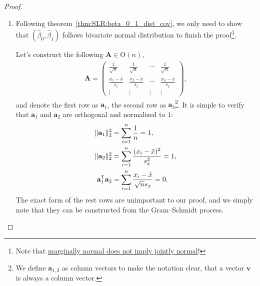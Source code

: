 \documentclass{book}
\begin{document}
\begin{proof}
\begin{enumerate}
\item Following theorem~\ref{thm:SLR:beta_0_1_dist_cov}, we only need to show that $(\hat{\beta}_0, \hat{\beta}_1)$ follows bivariate normal distribution to finish the proof\footnote{Note that \href{https://statproofbook.github.io/P/norm-margjoint.html}{marginally normal does not imply jointly normal}!}. 

Let's construct the following $\mathbf{A} \in \mathrm{O}(n)$,
\begin{align}
    \label{eqn:SLR:A-mat}
    \mathbf{A} = 
    \begin{pmatrix}
        \frac{1}{\sqrt{n}} & \frac{1}{\sqrt{n}} & \cdots & \frac{1}{\sqrt{n}}\\
        \frac{x_1-\bar{x}}{s_x} & \frac{x_2-\bar{x}}{s_x} & \cdots & \frac{x_n-\bar{x}}{s_x}\\
        \vdots & \vdots & \vdots & \vdots
    \end{pmatrix},
\end{align}
and denote the first row as $\mathbf{a}_{1}$, the second row as $\mathbf{a}_{2}$\footnote{We define $\mathbf{a}_{1,2}$ as column vectors to make the notation clear, that a vector $\mathbf{v}$ is always a column vector.}. It is simple to verify that $\mathbf{a}_{1}$ and $\mathbf{a}_{2}$ are orthogonal and normalized to $1$:
\begin{align*}
    \|\mathbf{a}_{1}\|_2^2 &= \sum_{i = 1}^{n}\frac{1}{n} = 1,\\
    \|\mathbf{a}_{2}\|_2^2 &= \sum_{i = 1}^{n}\frac{(x_i-\bar{x})^2}{s_x^2} = 1,\\
    \mathbf{a}_{1}^{\mathsf{T}} \mathbf{a}_{2} &= \sum_{i=1}^n\frac{x_i-\bar{x}}{\sqrt{n}s_x} = 0.
\end{align*}
The exact form of the rest rows are unimportant to our proof, and we simply note that they can be constructed from the Gram–Schmidt process. 


\end{enumerate}
\end{proof}
\end{document}

